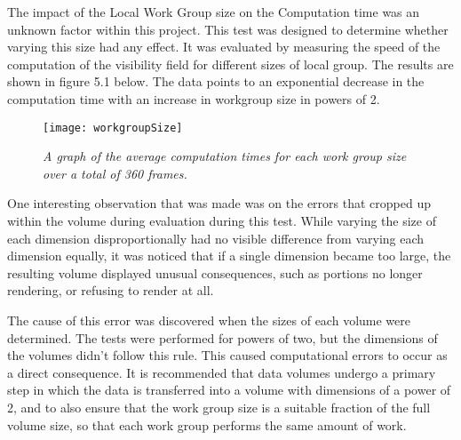 The impact of the Local Work Group size on the Computation time was an unknown factor within this project. This test was designed to determine whether varying this size had any effect. It was evaluated by measuring the speed of the computation of the visibility field for different sizes of local group. The results are shown in figure 5.1 below. The data points to an exponential decrease in the computation time with an increase in workgroup size in powers of 2.

\begin{figure}[H]
\centering
\texttt{[image: workgroupSize]} 
\caption{\textit{A graph of the average computation times for each work group size over a total of 360 frames.}}
\end{figure}

One interesting observation that was made was on the errors that cropped up within the volume during evaluation during this test. While varying the size of each dimension disproportionally had no visible difference from varying each dimension equally, it was noticed that if a single dimension became too large, the resulting volume displayed unusual consequences, such as portions no longer rendering, or refusing to render at all. 

The cause of this error was discovered when the sizes of each volume were determined. The tests were performed for powers of two, but the dimensions of the volumes didn't follow this rule. This caused computational errors to occur as a direct consequence. It is recommended that data volumes undergo a primary step in which the data is transferred into a volume with dimensions of a power of 2, and to also ensure that the work group size is a suitable fraction of the full volume size, so that each work group performs the same amount of work.